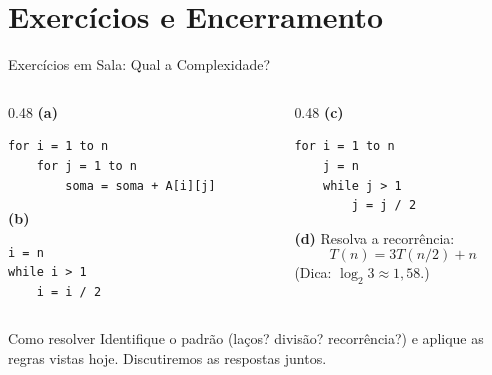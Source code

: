 \documentclass[aspectratio=169]{beamer}
\begin{document}
\section{Exercícios e Encerramento}

\begin{frame}{Exercícios em Sala: Qual a Complexidade?}
  \begin{columns}[T]
    \begin{column}{0.48\textwidth}
      \textbf{(a)}
\begin{verbatim}
for i = 1 to n
    for j = 1 to n
        soma = soma + A[i][j]
\end{verbatim}
      \textbf{(b)}
\begin{verbatim}
i = n
while i > 1
    i = i / 2
\end{verbatim}
    \end{column}
    \begin{column}{0.48\textwidth}
      \textbf{(c)}
\begin{verbatim}
for i = 1 to n
    j = n
    while j > 1
        j = j / 2
\end{verbatim}
      \textbf{(d)} Resolva a recorrência:
      \[
        T(n) = 3T(n/2) + n
      \]
      {\small (Dica: $\log_2 3 \approx 1{,}58$.)}
    \end{column}
  \end{columns}

  \vspace{0.4cm}
  \begin{alertblock}{Como resolver}
    Identifique o padrão (laços? divisão? recorrência?) e aplique as regras vistas hoje.
    Discutiremos as respostas juntos.
  \end{alertblock}
\end{frame}
\end{document}
